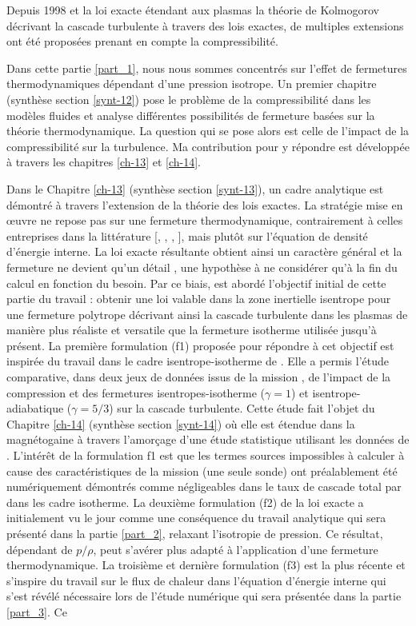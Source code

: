 Depuis 1998 et la loi exacte  étendant aux plasmas  la théorie de Kolmogorov décrivant la cascade turbulente à travers des lois exactes, de multiples extensions ont été proposées prenant en compte la compressibilité. 

Dans cette partie \ref{part_1}, nous nous sommes concentrés sur l'effet de fermetures thermodynamiques dépendant d'une pression isotrope. Un premier chapitre (synthèse section \ref{synt-12}) pose le problème de la compressibilité dans les modèles fluides et analyse différentes possibilités de fermeture basées sur la théorie thermodynamique. La question qui se pose alors est celle de l'impact de la compressibilité sur la turbulence. Ma contribution pour y répondre est développée à travers les chapitres \ref{ch-13} et \ref{ch-14}. 

Dans le Chapitre \ref{ch-13} (synthèse section \ref{synt-13}), un cadre analytique est démontré à travers l'extension de la théorie des lois exactes. La stratégie mise en œuvre ne repose pas sur une fermeture thermodynamique, contrairement à celles entreprises dans la littérature [\cite{galtier_exact_2011}, \cite{banerjee_exact_2013}, \cite{banerjee_kolmogorov-like_2014}, \cite{andres_alternative_2017}], mais plutôt sur l'équation de densité d'énergie interne. La loi exacte résultante obtient ainsi un caractère général et la fermeture ne devient qu'un \og détail \fg{}, une hypothèse à ne considérer qu'à la fin du calcul en fonction du besoin. Par ce biais, est abordé l'objectif initial de cette partie du travail : obtenir une loi valable dans la zone inertielle isentrope pour une fermeture polytrope décrivant ainsi la cascade turbulente dans les plasmas de manière plus réaliste et versatile que la fermeture isotherme utilisée jusqu'à présent. La première formulation (f1) proposée pour répondre à cet objectif est inspirée du travail dans le cadre isentrope-isotherme de \cite{andres_energy_2018}. Elle a permis l'étude comparative, dans deux jeux de données issus de la mission , de l'impact de la compression et des fermetures isentropes-isotherme ($\gamma = 1$) et isentrope-adiabatique ($\gamma = 5/3$) sur la cascade turbulente. Cette étude fait l'objet du Chapitre \ref{ch-14}  (synthèse section \ref{synt-14}) où elle est étendue dans la magnétogaine à travers l'amorçage d'une étude statistique utilisant les données de . L'intérêt de la formulation f1 est que les termes sources impossibles à calculer à cause des caractéristiques de la mission  (une seule sonde) ont préalablement été numériquement démontrés comme négligeables dans le taux de cascade total par \cite{andres_energy_2018} dans les cadre isotherme. La deuxième formulation (f2) de la loi exacte a initialement vu le jour comme une conséquence du travail analytique qui sera présenté dans la partie \ref{part_2}, relaxant l'isotropie de pression. Ce résultat, dépendant de $p/\rho$, peut s'avérer plus adapté à l'application d'une fermeture thermodynamique. La troisième et dernière formulation (f3) est la plus récente et s'inspire du travail sur le flux de chaleur dans l'équation d'énergie interne qui s'est révélé nécessaire lors de l'étude numérique qui sera présentée dans la partie \ref{part_3}. Ce 
